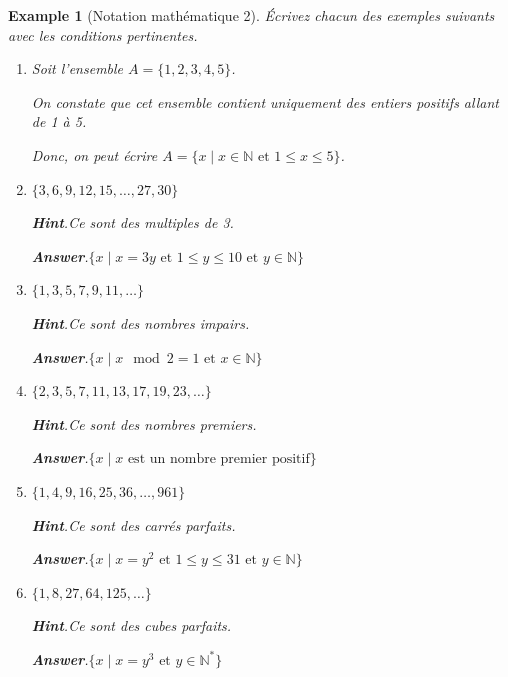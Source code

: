 \documentclass[pdflatex]{sn-jnl}
\theoremstyle{thmstyleone}%
\theoremstyle{thmstyletwo}%
\newtheorem{example}[theorem]{Example}
\theoremstyle{thmstylethree}%
\newcommand{\blocktitlefont}{\relax}
\numberwithin{equation}{section}
\begin{document}
\begin{example}[Notation mathématique 2]\label{example-structured-with-task}%
%
Écrivez chacun des exemples suivants avec les conditions pertinentes.%
\begin{enumerate}[font=\bfseries,label=(\alph*),ref=\alph*]%
\item{}Soit l'ensemble \(A=\lbrace 1,2,3,4,5\rbrace\).%
\par
On constate que cet ensemble contient uniquement des entiers positifs allant de 1 à 5.%
\par
Donc, on peut écrire \(A=\lbrace x\mid x\in\mathbb{N}\text{ et } 1\leq x\leq 5\rbrace\).%
\item{}\(\{3,6,9,12,15,\ldots,27,30\}\)%
\par\smallskip%
\noindent\textbf{\blocktitlefont Hint}.\hypertarget{example-structured-with-task-5-2}{}\quad{}Ce sont des multiples de 3.%
\par\smallskip%
\noindent\textbf{\blocktitlefont Answer}.\hypertarget{example-structured-with-task-5-3}{}\quad{}\(\{x\mid x=3y \text{ et } 1\leq y\leq 10 \text{ et } y\in\mathbb{N}\}\)%
\item{}\(\{1,3,5,7,9,11,\ldots\}\)%
\par\smallskip%
\noindent\textbf{\blocktitlefont Hint}.\hypertarget{example-structured-with-task-6-2}{}\quad{}Ce sont des nombres impairs.%
\par\smallskip%
\noindent\textbf{\blocktitlefont Answer}.\hypertarget{example-structured-with-task-6-3}{}\quad{}\(\{x\mid x\mod 2=1 \text{ et } x\in\mathbb{N}\}\)%
\item{}\(\{2,3,5,7,11,13,17,19,23,\ldots\}\)%
\par\smallskip%
\noindent\textbf{\blocktitlefont Hint}.\hypertarget{example-structured-with-task-7-2}{}\quad{}Ce sont des nombres premiers.%
\par\smallskip%
\noindent\textbf{\blocktitlefont Answer}.\hypertarget{example-structured-with-task-7-3}{}\quad{}\(\{x\mid x\text{ est un nombre premier positif}\}\)%
\item{}\(\{1,4,9,16,25,36,\ldots,961\}\)%
\par\smallskip%
\noindent\textbf{\blocktitlefont Hint}.\hypertarget{example-structured-with-task-8-2}{}\quad{}Ce sont des carrés parfaits.%
\par\smallskip%
\noindent\textbf{\blocktitlefont Answer}.\hypertarget{example-structured-with-task-8-3}{}\quad{}\(\{x\mid x=y^2 \text{ et } 1\leq y\leq 31\text{ et } y\in\mathbb{N}\}\)%
\item{}\(\{1,8,27,64,125,\ldots\}\)%
\par\smallskip%
\noindent\textbf{\blocktitlefont Hint}.\hypertarget{example-structured-with-task-9-2}{}\quad{}Ce sont des cubes parfaits.%
\par\smallskip%
\noindent\textbf{\blocktitlefont Answer}.\hypertarget{example-structured-with-task-9-3}{}\quad{}\(\{x\mid x=y^3 \text{ et } y\in\mathbb{N^*}\}\)%
\end{enumerate}%
\end{example}
\end{document}

